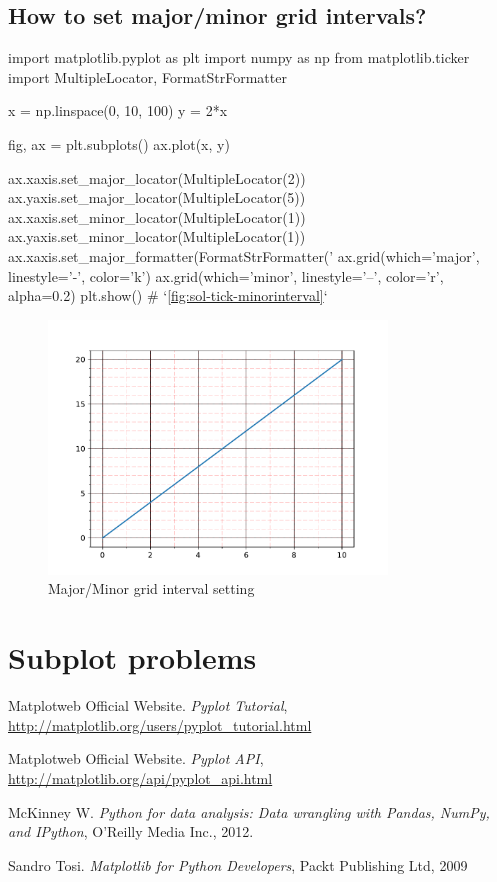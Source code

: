 \documentclass{report}
\begin{document}
\subsection{How to set major/minor grid intervals?}
\begin{py}
import matplotlib.pyplot as plt
import numpy as np
from matplotlib.ticker import MultipleLocator, FormatStrFormatter

x = np.linspace(0, 10, 100)
y = 2*x

fig, ax = plt.subplots()
ax.plot(x, y)

ax.xaxis.set_major_locator(MultipleLocator(2))
ax.yaxis.set_major_locator(MultipleLocator(5))
ax.xaxis.set_minor_locator(MultipleLocator(1))
ax.yaxis.set_minor_locator(MultipleLocator(1))
ax.xaxis.set_major_formatter(FormatStrFormatter('%
ax.grid(which='major', linestyle='-', color='k')
ax.grid(which='minor', linestyle='--', color='r', alpha=0.2)
plt.show() # `\autoref{fig:sol-tick-minorinterval}`
\end{py}

\begin{figure}[!htb]
  \centering
  \includegraphics[width=90mm]{sol-tick-minorinterval}
  \caption{Major/Minor grid interval setting}
  \label{fig:sol-tick-minorinterval}
\end{figure}

\section{Subplot problems}
\label{sec:advancedsubplot}

%
%

\appendix
\renewcommand{\chaptername}{Appendix}

\begin{thebibliography}{9}
 Matplotweb Official Website. 
  \newblock \emph{Pyplot Tutorial}, \\ \url{http://matplotlib.org/users/pyplot_tutorial.html}

 Matplotweb Official Website. 
  \newblock \emph{Pyplot API}, \\  
  \url{http://matplotlib.org/api/pyplot_api.html}
  
 McKinney W. 
  \newblock \emph{Python for data analysis: Data wrangling with Pandas, NumPy, and IPython}, 
  \newblock O'Reilly Media Inc., 2012.
  
 Sandro Tosi.
  \newblock \emph{Matplotlib for Python Developers},
  \newblock Packt Publishing Ltd, 2009
\end{thebibliography}
\end{document}
